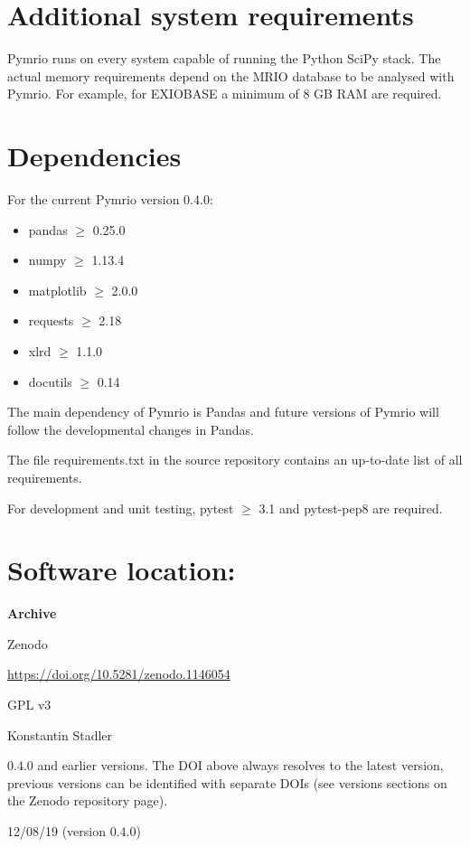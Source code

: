\documentclass{jors}
\begin{document}
\section*{Additional system requirements}

Pymrio runs on every system capable of running the Python SciPy stack.
The actual memory requirements depend on the MRIO database to be analysed with Pymrio. For example, for EXIOBASE \cite{stadler2018_EXIOBASE} a minimum of 8 GB RAM are required. 

\section*{Dependencies}

For the current Pymrio version 0.4.0:

\begin{itemize}
    \item pandas $\ge$ 0.25.0
    \item numpy $\ge$ 1.13.4
    \item matplotlib $\ge$ 2.0.0
    \item requests $\ge$ 2.18
    \item xlrd $\ge$ 1.1.0 
    \item docutils $\ge$ 0.14 
\end{itemize}

The main dependency of Pymrio is Pandas and future versions of Pymrio will follow the developmental changes in Pandas.

The file requirements.txt in the source repository contains an up-to-date list of all requirements.

For development and unit testing, pytest $\ge$ 3.1 and pytest-pep8 are required.

\section*{Software location:}

{\bf Archive} 

\begin{description}[noitemsep,topsep=0pt]
	\item[Name:] Zenodo
    \item[Persistent identifier:] \url{https://doi.org/10.5281/zenodo.1146054}
	\item[Licence:] GPL v3
	\item[Publisher:]  Konstantin Stadler
    \item[Version published:] 0.4.0 and earlier versions. The DOI above always resolves to the latest version, previous versions can be identified with separate DOIs (see versions sections on the Zenodo repository page). 
    \item[Date published:] 12/08/19 (version 0.4.0)
\end{description}
\end{document}
